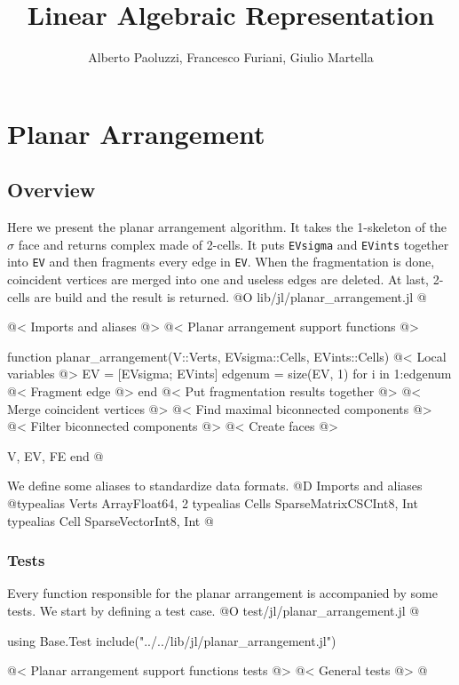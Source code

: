 \documentclass[10pt]{book}
\author{Alberto Paoluzzi, Francesco Furiani, Giulio Martella}
\title{Linear Algebraic Representation}
\begin{document}
\frontmatter
\maketitle
\tableofcontents





\mainmatter

\chapter{Planar Arrangement}

\section{Overview}
Here we present the planar arrangement algorithm. It takes the 1-skeleton of the $\sigma$ face and returns complex made of 2-cells.
It puts \texttt{EVsigma} and \texttt{EVints} together into \texttt{EV} and then fragments every edge in \texttt{EV}. 
When the fragmentation is done, coincident vertices are merged into one and useless edges are deleted. At last,
2-cells are build and the result is returned.
@O lib/jl/planar_arrangement.jl
@{@< Imports and aliases @>
@< Planar arrangement support functions @>

function planar_arrangement(V::Verts, EVsigma::Cells, EVints::Cells)
    @< Local variables @>
    EV = [EVsigma; EVints]
    edgenum = size(EV, 1)
    for i in 1:edgenum
        @< Fragment edge @>
    end
    @< Put fragmentation results together @>
    @< Merge coincident vertices @>
    @< Find maximal biconnected components @>
    @< Filter biconnected components @>
    @< Create faces @>

    V, EV, FE
end 
@}
We define some aliases to standardize data formats.
@D Imports and aliases
@{typealias Verts Array{Float64, 2}
typealias Cells SparseMatrixCSC{Int8, Int}
typealias Cell SparseVector{Int8, Int}
@}
\subsection{Tests}
Every function responsible for the planar arrangement is accompanied by some tests.
We start by defining a test case.
@O test/jl/planar_arrangement.jl
@{using Base.Test
include("../../lib/jl/planar_arrangement.jl")

@< Planar arrangement support functions tests @>
@< General tests @>
@}
\end{document}
